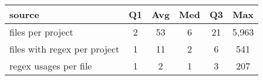 \begin{center}
\begin{tabular}{l|ccccc}
\toprule
source & Q1 & Avg & Med & Q3 & Max \\ 
\midrule
files per project & 2 & 53 & 6 & 21 & 5,963 \\ 
\midrule
files with regex per project & 1 & 11 & 2 & 6 & 541 \\ 
\midrule
regex usages per file & 1 & 2 & 1 & 3 & 207 \\ 
\bottomrule
\end{tabular}
\end{center}
